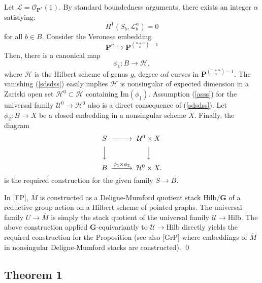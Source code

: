 \documentclass[11 pt]{amsart}
\newcommand{\proj}{\mathbf P}
\newcommand{\rarr}{\rightarrow}
\newcommand{\oh}{{\mathcal{O}}}
\newcommand{\G}{\mathbf{G}}
\newcommand{\epf}{\qed \vspace{+10pt}}
\begin{document}
Let $\mathcal{L}=\oh_{\proj^r}(1)$.
By standard boundedness arguments, there exists
an integer $\alpha$ satisfying: 
\begin{equation}
\label{sdsdss}
H^1(S_b, \mathcal{L}^\alpha_b)=0
\end{equation}
for all $b\in B$. Consider the Veronese embedding
$$\proj^n \rarr \proj^{\binom{n+\alpha}{\alpha}-1}$$
Then, there is a canonical map
$$\phi_1: B \rarr \mathcal{H},$$
where
$\mathcal{H}$ is the Hilbert scheme 
of genus $g$, degree $\alpha d$ curves in 
$\proj^{\binom{n+\alpha}{\alpha}-1}$.
The vanishing (\ref{sdsdss}) easily implies $\mathcal{H}$
is nonsingular of expected dimension in a Zariski open set
$\mathcal{H}^0 \subset \mathcal{H}$
containing 
$\text{Im}(\phi_1)$.
Assumption (\ref{asss}) for the
universal family $\mathcal{U}^0 \rarr \mathcal{H}^0$
also is a direct consequence of (\ref{sdsdss}).
Let $\phi_2:B \rarr X$ be a closed embedding in a 
nonsingular scheme $X$.
Finally, the diagram
\begin{equation*}
\begin{CD}
S
@>>>  \mathcal{U}^0 \times X \\
@VVV   @VVV \\
B @>{\phi_1 \times \phi_2}>> \mathcal{H}^0 \times X.
\end{CD}
\end{equation*}
is the required construction 
for the given family
$S \rarr B$.




In [FP], $\overline{M}$ is constructed as a Deligne-Mumford
quotient stack $\text{Hilb}/\G$ of a reductive group action
on a Hilbert scheme of pointed graphs. 
The universal family $U \rarr \overline{M}$ is simply
the stack quotient of the universal family $\mathcal{U} \rarr
\text{Hilb}$.
The above construction applied $\G$-equivariantly
to $\mathcal{U} \rarr \text{Hilb}$ directly yields
the required construction for the Proposition
(see also [GrP] where embeddings of $\overline{M}$ in
nonsingular Deligne-Mumford stacks are constructed).
\epf

\subsection{Theorem 1}
\end{document}
